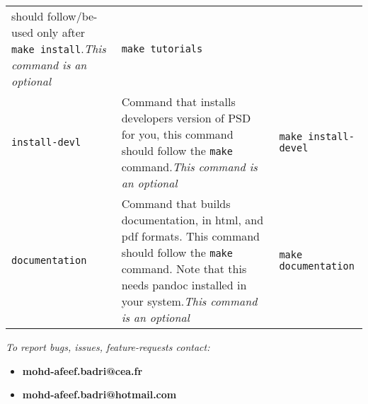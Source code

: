 \begin{longtable}[]{@{}lll@{}}
\begin{minipage}[t]{0.47\columnwidth}
should follow/be-used only after \lstinline!make install!.\emph{This
command is an optional}\strut
\end{minipage} & \begin{minipage}[t]{0.30\columnwidth}\raggedright\strut
\lstinline!make tutorials!\strut
\end{minipage}\tabularnewline
\begin{minipage}[t]{0.15\columnwidth}\raggedright\strut
\lstinline!install-devl!\strut
\end{minipage} & \begin{minipage}[t]{0.47\columnwidth}\raggedright\strut
Command that installs developers version of PSD for you, this command
should follow the \lstinline!make! command.\emph{This command is an
optional}\strut
\end{minipage} & \begin{minipage}[t]{0.30\columnwidth}\raggedright\strut
\lstinline!make install-devel!\strut
\end{minipage}\tabularnewline
\begin{minipage}[t]{0.15\columnwidth}\raggedright\strut
\lstinline!documentation!\strut
\end{minipage} & \begin{minipage}[t]{0.47\columnwidth}\raggedright\strut
Command that builds documentation, in html, and pdf formats. This
command should follow the \lstinline!make! command. Note that this needs
pandoc installed in your system.\emph{This command is an optional}\strut
\end{minipage} & \begin{minipage}[t]{0.30\columnwidth}\raggedright\strut
\lstinline!make documentation!\strut
\end{minipage}\tabularnewline
\bottomrule
\end{longtable}

\emph{To report bugs, issues, feature-requests contact:}

\begin{itemize}
\tightlist
\item
  \textbf{mohd-afeef.badri@cea.fr}
\item
  \textbf{mohd-afeef.badri@hotmail.com}
\end{itemize}
